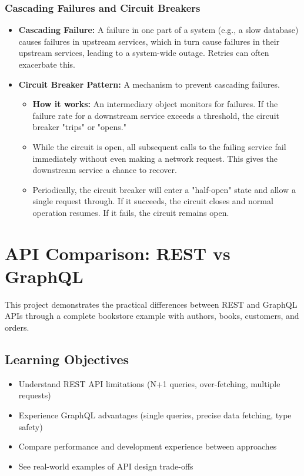 \documentclass{article}
\begin{document}
\subsubsection{Cascading Failures and Circuit Breakers}
\begin{itemize}
    \item \textbf{Cascading Failure:} A failure in one part of a system (e.g., a slow database) causes failures in upstream services, which in turn cause failures in their upstream services, leading to a system-wide outage. Retries can often exacerbate this.
    \item \textbf{Circuit Breaker Pattern:} A mechanism to prevent cascading failures.
    \begin{itemize}
        \item \textbf{How it works:} An intermediary object monitors for failures. If the failure rate for a downstream service exceeds a threshold, the circuit breaker "trips" or "opens."
        \item While the circuit is open, all subsequent calls to the failing service fail immediately without even making a network request. This gives the downstream service a chance to recover.
        \item Periodically, the circuit breaker will enter a "half-open" state and allow a single request through. If it succeeds, the circuit closes and normal operation resumes. If it fails, the circuit remains open.
    \end{itemize}
\end{itemize}

\newpage
\section{API Comparison: REST vs GraphQL}
This project demonstrates the practical differences between REST and GraphQL APIs through a complete bookstore example with authors, books, customers, and orders.

\subsection{Learning Objectives}
\begin{itemize}
    \item Understand REST API limitations (N+1 queries, over-fetching, multiple requests)
    \item Experience GraphQL advantages (single queries, precise data fetching, type safety)
    \item Compare performance and development experience between approaches
    \item See real-world examples of API design trade-offs
\end{itemize}
\end{document}
